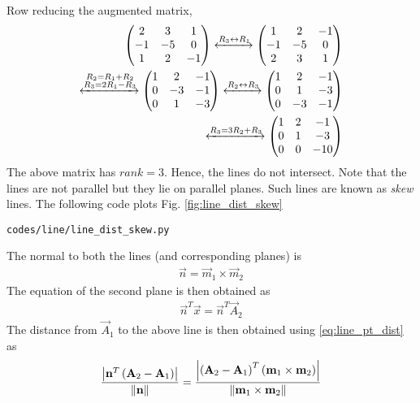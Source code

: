 \documentclass[journal,12pt,twocolumn]{IEEEtran}
\renewcommand\thesection{\arabic{section}}
\begin{document}
\begin{enumerate}[label=\thesection.\arabic*.,ref=\thesection.\theenumi]
\begin{align}
\end{align}
%
Row reducing the augmented matrix,
%
\begin{align}
\begin{pmatrix}
2 & 3 & 1 
\\
-1 & -5 & 0
\\
1 & 2 & -1
\end{pmatrix}
\xleftrightarrow[]{R_3\leftrightarrow R_1}
\begin{pmatrix}
1 & 2 & -1
\\
-1 & -5 & 0
\\
2 & 3 & 1 
\end{pmatrix}
\\
\xleftrightarrow[]{\substack{R_2= R_1+R_2\\R_3 = 2R_1-R_3}}
\begin{pmatrix}
1 & 2 & -1
\\
0 & -3 & -1
\\
0 & 1 & -3 
\end{pmatrix}
\xleftrightarrow[]{R_2\leftrightarrow R_3}
\begin{pmatrix}
1 & 2 & -1
\\
0 & 1 & -3 
\\
0 & -3 & -1
\end{pmatrix}
\\
\xleftrightarrow[]{R_3=3R_2+R_3}
\begin{pmatrix}
1 & 2 & -1
\\
0 & 1 & -3 
\\
0 & 0 & -10
\end{pmatrix}
\end{align}
%
The above matrix has $rank = 3$.  Hence, the lines do not intersect.  Note that the lines are not parallel but they  lie on parallel planes.  Such lines are known as {\em skew} lines.  
The following code plots 
Fig. \ref{fig:line_dist_skew} 
%
\begin{lstlisting}
codes/line/line_dist_skew.py
\end{lstlisting}
%
%

The normal to both the lines (and corresponding planes) is 
%
\begin{align}
\label{eq:line_dist_skew_normal}
\vec{n} = \vec{m}_1\times\vec{m}_2
\end{align}
%
The equation of the second plane is then obtained as
%
\begin{align}
\label{eq:line_dist_skew_plane2}
\vec{n}^T \vec{x} = \vec{n}^T \vec{A}_2 
\end{align}
%
The distance from $\vec{A}_1$ to the above line is then obtained using 
\eqref{eq:line_pt_dist} as
%
\begin{align}
\label{eq:line_dist_skew}
\frac{\left\vert\mathbf{n}^T\left(\mathbf{A}_2-\mathbf{A}_1\right)\right\vert}{\left\lVert\mathbf{n}\right\rVert}
=
\frac{\left\vert\left(\mathbf{A}_2-\mathbf{A}_1\right)^T\left(\mathbf{m}_1\times\mathbf{m}_2\right)\right\vert}{\left\lVert\mathbf{m}_1\times\mathbf{m}_2\right\rVert}
\end{align}
%


\end{enumerate}
\end{document}
